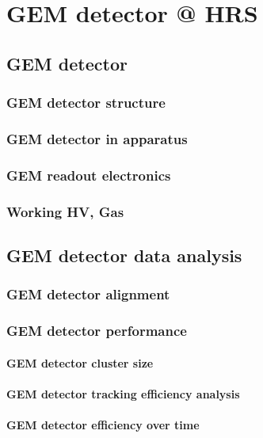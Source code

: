 \chapter{GEM detector @ HRS}

\section{GEM detector}
\subsection{GEM detector structure}
\subsection{GEM detector in apparatus}
\subsection{GEM readout electronics}
\subsection{Working HV, Gas}

\section{GEM detector data analysis}
\subsection{GEM detector alignment}
\subsection{GEM detector performance}
\subsubsection{GEM detector cluster size}
\subsubsection{GEM detector tracking efficiency analysis}
\subsubsection{GEM detector efficiency over time}

